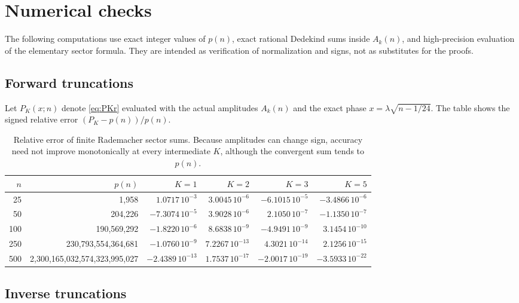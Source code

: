 \documentclass[11pt,a4paper]{article}
\numberwithin{equation}{section}
\theoremstyle{remark}
\begin{document}
\section{Numerical checks}\label{sec:numerics}

The following computations use exact integer values of $p(n)$, exact rational Dedekind sums inside $A_k(n)$, and high-precision evaluation of the elementary sector formula.  They are intended as verification of normalization and signs, not as substitutes for the proofs.

\subsection{Forward truncations}

Let $P_K(x;n)$ denote \cref{eq:PKr} evaluated with the actual amplitudes $A_k(n)$ and the exact phase $x=\lambda\sqrt{n-1/24}$.  The table shows the signed relative error
$(P_K-p(n))/p(n)$.

\begin{table}[htbp]
\centering
\small
\begin{tabular}{r r r r r r}
\toprule
$n$ & $p(n)$ & $K=1$ & $K=2$ & $K=3$ & $K=5$\\
\midrule
25  & 1,958 & $ 1.0717\,10^{-3}$ & $ 3.0045\,10^{-6}$ & $-6.1015\,10^{-5}$ & $-3.4866\,10^{-6}$\\
50  & 204,226 & $-7.3074\,10^{-5}$ & $ 3.9028\,10^{-6}$ & $ 2.1050\,10^{-7}$ & $-1.1350\,10^{-7}$\\
100 & 190,569,292 & $-1.8220\,10^{-6}$ & $ 8.6838\,10^{-9}$ & $-4.9491\,10^{-9}$ & $ 3.1454\,10^{-10}$\\
250 & 230,793,554,364,681 & $-1.0760\,10^{-9}$ & $ 7.2267\,10^{-13}$ & $ 4.3021\,10^{-14}$ & $ 2.1256\,10^{-15}$\\
500 & 2,300,165,032,574,323,995,027 & $-2.4389\,10^{-13}$ & $1.7537\,10^{-17}$ & $-2.0017\,10^{-19}$ & $-3.5933\,10^{-22}$\\
\bottomrule
\end{tabular}
\caption{Relative error of finite Rademacher sector sums.  Because amplitudes can change sign, accuracy need not improve monotonically at every intermediate $K$, although the convergent sum tends to $p(n)$.}
\label{tab:forward-errors}
\end{table}

\subsection{Inverse truncations}
\end{document}

